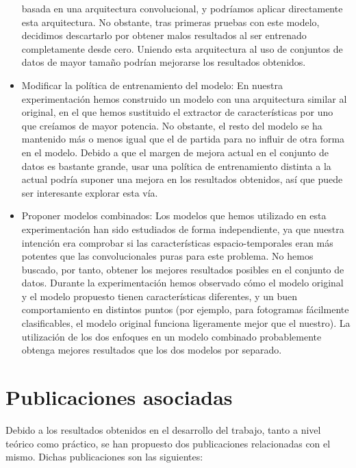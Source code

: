 \documentclass[../main.tex]{memoir}
\begin{document}
\begin{itemize}
  basada en una arquitectura convolucional, y podríamos aplicar
  directamente esta arquitectura. No obstante, tras primeras pruebas
  con este modelo, decidimos descartarlo por obtener malos resultados
  al ser entrenado completamente desde cero. Uniendo esta arquitectura
  al uso de conjuntos de datos de mayor tamaño podrían mejorarse los
  resultados obtenidos.
\item Modificar la política de entrenamiento del modelo: En nuestra
  experimentación hemos construido un modelo con una arquitectura
  similar al original, en el que hemos sustituido el extractor de
  características por uno que creíamos de mayor potencia. No obstante,
  el resto del modelo se ha mantenido más o menos igual que el de
  partida para no influir de otra forma en el modelo. Debido a que el
  margen de mejora actual en el conjunto de datos es bastante grande,
  usar una política de entrenamiento distinta a la actual podría
  suponer una mejora en los resultados obtenidos, así que puede ser
  interesante explorar esta vía.
\item Proponer modelos combinados: Los modelos que hemos utilizado en
  esta experimentación han sido estudiados de forma independiente, ya
  que nuestra intención era comprobar si las características
  espacio-temporales eran más potentes que las convolucionales puras
  para este problema. No hemos buscado, por tanto, obtener los mejores
  resultados posibles en el conjunto de datos. Durante la
  experimentación hemos observado cómo el modelo original y el modelo
  propuesto tienen características diferentes, y un buen
  comportamiento en distintos puntos (por ejemplo, para fotogramas
  fácilmente clasificables, el modelo original funciona ligeramente
  mejor que el nuestro). La utilización de los dos enfoques en un
  modelo combinado probablemente obtenga mejores resultados que los
  dos modelos por separado.
\end{itemize}

\section{Publicaciones asociadas}

Debido a los resultados obtenidos en el desarrollo del trabajo, tanto
a nivel teórico como práctico, se han propuesto dos publicaciones
relacionadas con el mismo. Dichas publicaciones son las siguientes:
\end{document}
